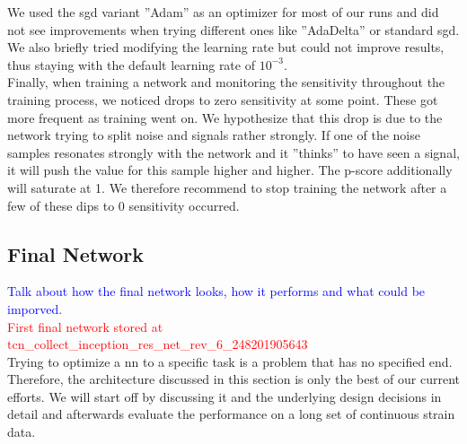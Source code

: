 We used the \gls{sgd} variant ''Adam'' as an optimizer for most of our runs and did not see improvements when trying different ones like ''AdaDelta'' or standard \gls{sgd}. We also briefly tried modifying the learning rate but could not improve results, thus staying with the default learning rate of $10^{-3}$.\\
Finally, when training a network and monitoring the sensitivity throughout the training process, we noticed drops to zero sensitivity at some point. These got more frequent as training went on. We hypothesize that this drop is due to the network trying to split noise and signals rather strongly. If one of the noise samples resonates strongly with the network and it ''thinks'' to have seen a signal, it will push the value for this sample higher and higher. The p-score additionally will saturate at 1. We therefore recommend to stop training the network after a few of these dips to 0 sensitivity occurred.


\subsection{Final Network}
\textcolor{blue}{Talk about how the final network looks, how it performs and what could be imporved.}\\
\textcolor{red}{First final network stored at tcn\_collect\_inception\_res\_net\_rev\_6\_248201905643}\\
Trying to optimize a \gls{nn} to a specific task is a problem that has no specified end. Therefore, the architecture discussed in this section is only the best of our current efforts. We will start off by discussing it and the underlying design decisions in detail and afterwards evaluate the performance on a long set of continuous strain data.
